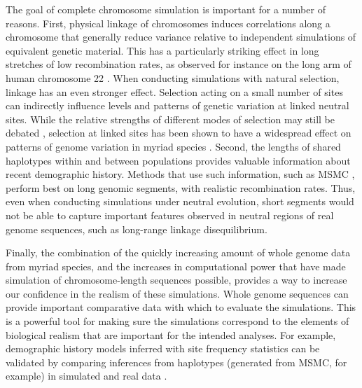\documentclass[hidelinks]{article}
\begin{document}
The goal of complete chromosome simulation is important for a number of reasons.
First, physical linkage of chromosomes induces correlations along a chromosome that
generally reduce variance relative to independent simulations of equivalent genetic material.
This has a particularly striking effect in long stretches of low recombination rates,
as observed for instance on the long arm of human chromosome 22 \citep{Dawson2002}.
When conducting simulations with natural selection, linkage has
an even stronger effect. Selection acting on a small number of sites can
indirectly influence levels and patterns of genetic variation at linked
neutral sites. While the relative strengths of different modes of selection
may still be debated \citep{kern2018neutral,jensen2019importance},
selection at linked sites has been shown to have a widespread
effect on patterns of genome variation in myriad species
\citep[e.g.,][]{McVicker2009,Charlesworth2012}. 
Second, the lengths of shared haplotypes within and
between populations provides valuable information about recent demographic history.
Methods that use such information, such as MSMC \citep{Schiffels2020}, perform best
on long genomic segments, with realistic recombination rates.
Thus, even when conducting simulations under neutral evolution, short segments
would not be able to capture important features observed in neutral regions of
real genome sequences, such as long-range linkage disequilibrium.
%

Finally, the combination of the quickly increasing amount of whole genome data from
myriad species, and the increases in computational power that have made simulation
of chromosome-length sequences possible, provides a way to increase our confidence
in the realism of these simulations. Whole genome sequences can provide important comparative
data with which to evaluate the simulations. This is a powerful tool for
making sure the simulations correspond to the elements of biological
realism that are important for the intended analyses.
For example, demographic history models inferred with site frequency statistics \citep{Gutenkunst2009}
can be validated by comparing inferences from haplotypes (generated from MSMC, for example)
in simulated and real data \citep[e.g.,][]{Hsieh2016a}.
\end{document}
